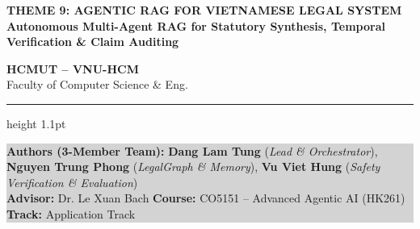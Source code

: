 \documentclass[10pt,a4paper]{article}
\begin{document}
\begin{minipage}[b]{0.70\linewidth}
  {\fontsize{11.2pt}{12.5pt}\bfseries\color{primary} THEME 9: AGENTIC RAG FOR VIETNAMESE LEGAL SYSTEM}\\[1.5pt]
  {\fontsize{8.2pt}{9.5pt}\bfseries\color{darkgray} Autonomous Multi-Agent RAG for Statutory Synthesis, Temporal Verification \& Claim Auditing}
\end{minipage}%
\hfill
\begin{minipage}[b]{0.29\linewidth}
  \raggedleft\fontsize{7.2pt}{8.6pt}\selectfont\color{darkgray}
  \textbf{HCMUT -- VNU-HCM}\\
  Faculty of Computer Science \& Eng.
\end{minipage}

\vspace{1.5pt}\hrule height 1.1pt \color{primary}\vspace{2.5pt}

\colorbox{lightgray}{%
  \parbox{\dimexpr\linewidth-2\fboxsep}{%
    \fontsize{7.2pt}{8.6pt}\selectfont\color{darkgray}
    \textbf{Authors (3-Member Team):}
    \textbf{Dang Lam Tung} (\textit{Lead \& Orchestrator}),
    \textbf{Nguyen Trung Phong} (\textit{LegalGraph \& Memory}),
    \textbf{Vu Viet Hung} (\textit{Safety Verification \& Evaluation})\\
    \textbf{Advisor:} Dr. Le Xuan Bach \hfill
    \textbf{Course:} CO5151 -- Advanced Agentic AI (HK261) \hfill
    \textbf{Track:} Application Track
  }%
}
\vspace{1pt}

\end{document}
